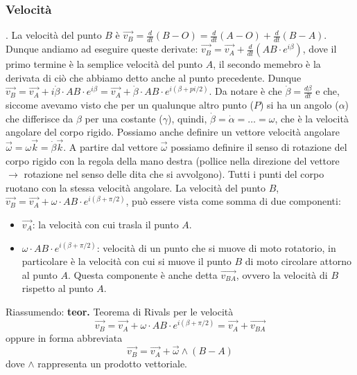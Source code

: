 \subsubsection{Velocità}. La velocità del punto $B$ è $\vec{v_B} = \frac{d}{dt}(B-O) = \frac{d}{dt}(A-O) + \frac{d}{dt}(B-A)$. Dunque andiamo ad eseguire queste derivate: $\vec{v_B} = \vec{v_A} + \frac{d}{dt} (AB \cdot e^{i \beta})$, dove il primo termine è la semplice velocità del punto $A$, il secondo memebro è la derivata di ciò che abbiamo detto anche al punto precedente. Dunque $\vec{v_B} = \vec{v_A} + i \dot{\beta} \cdot AB \cdot e^{i \beta} = \vec{v_A} + \dot{\beta} \cdot AB \cdot e^{i(\beta + pi/2)}$. Da notare è che $\dot{\beta} = \frac{d \beta}{d t}$ e che, siccome avevamo visto che per un qualunque altro punto ($P$) si ha un angolo ($\alpha$) che differisce da $\beta$ per una costante ($\gamma$), quindi, $\dot{\beta} = \dot{\alpha} = \dots = \omega$, che è la velocità angolare del corpo rigido. Possiamo anche definire un vettore velocità angolare $\vec{\omega} = \omega \vec{k} = \dot{\beta} \vec{k}$.\newline
A partire dal vettore $\vec{\omega}$ possiamo definire il senso di rotazione del corpo rigido con la regola della mano destra (pollice nella direzione del vettore $\rightarrow $ rotazione nel senso delle dita che si avvolgono).\newline
Tutti i punti del corpo ruotano con la stessa velocità angolare.\newline
La velocità del punto $B$, $\vec{v_B} = \vec{v_A} + \omega \cdot AB \cdot e^{i(\beta + \pi/2)}$, può essere vista come somma di due componenti:
\begin{itemize}
    \item $\vec{v_A}$: la velocità con cui trasla il punto $A$.
    \item $\omega \cdot AB \cdot e^{i(\beta + \pi/2)}$: velocità di un punto che si muove di moto rotatorio, in particolare è la velocità con cui si muove il punto $B$ di moto circolare attorno al punto $A$. Questa componente è anche detta $\vec{v_{BA}}$, ovvero la velocità di $B$ rispetto al punto $A$.
\end{itemize}
Riassumendo: \newline
\textbf{teor.} Teorema di Rivals per le velocità
\[
    \vec{v_B} = \vec{v_A} + \omega \cdot AB \cdot e^{i(\beta + \pi/2)} = \vec{v_A} + \vec{v_{BA}}
\]
oppure in forma abbreviata
\[
    \vec{v_B} = \vec{v_A} + \vec{\omega}\land(B-A)
\]
dove $\land$ rappresenta un prodotto vettoriale.
